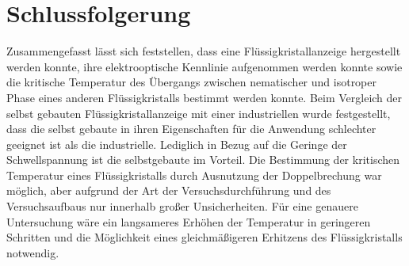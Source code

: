 \documentclass[
	a4paper,
	12pt,
	pagesize,
	ngerman
]{scrartcl}
\begin{document}
	\section{Schlussfolgerung}


	Zusammengefasst lässt sich feststellen, dass eine Flüssigkristallanzeige hergestellt werden konnte, ihre elektrooptische Kennlinie aufgenommen werden konnte sowie die kritische Temperatur des Übergangs zwischen nematischer und isotroper Phase eines anderen Flüssigkristalls bestimmt werden konnte.
	Beim Vergleich der selbst gebauten Flüssigkristallanzeige mit einer industriellen wurde festgestellt, dass die selbst gebaute in ihren Eigenschaften für die Anwendung schlechter geeignet ist als die industrielle.
	Lediglich in Bezug auf die Geringe der Schwellspannung ist die selbstgebaute im Vorteil.
	Die Bestimmung der kritischen Temperatur eines Flüssigkristalls durch Ausnutzung der Doppelbrechung war möglich, aber aufgrund der Art der Versuchsdurchführung und des Versuchsaufbaus nur innerhalb großer Unsicherheiten.
	Für eine genauere Untersuchung wäre ein langsameres Erhöhen der Temperatur in geringeren Schritten und die Möglichkeit eines gleichmäßigeren Erhitzens des Flüssigkristalls notwendig.

\end{document}

